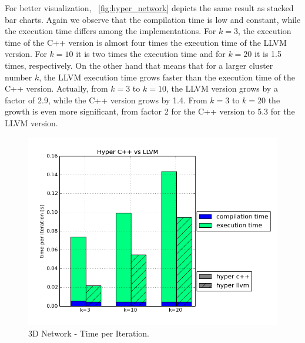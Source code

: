 For better visualization, ~\autoref{fig:hyper_network} depicts the same result as stacked bar charts. Again we observe that the compilation time is low and constant, while the execution time differs among the implementations. For $k = 3$, the execution time of the C++ version is almost four times the execution time of the LLVM version. For $k = 10$ it is two times the execution time and for $k = 20$ it is 1.5 times, respectively. On the other hand that means that for a larger cluster number $k$, the LLVM execution time grows  faster than the execution time of the C++ version. Actually, from $k = 3$ to $k = 10$, the LLVM version grows by a factor of 2.9, while the C++ version grows by 1.4. From $k = 3$ to $k = 20$ the growth is even more significant, from factor 2 for the C++ version to 5.3 for the LLVM version.


\begin{figure}[htsb]
  \centering
  \includegraphics[scale=0.5, trim="0cm 1.5cm 0cm 0cm"]{figures/charts/hyper_network}
  \caption[3D Network - Time per Iteration (Serial)]{3D Network - Time per Iteration.}
  \label{fig:hyper_network}
\end{figure}

